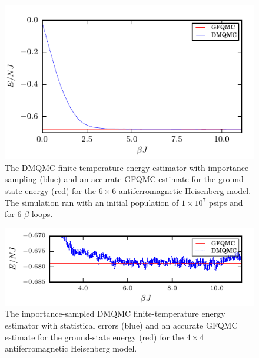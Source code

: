 \begin{figure}[H]
\begin{center}
\includegraphics[width =1\textwidth]{6x6_10000000_6_energy.pdf}
\caption[The DMQMC finite-temperature energy estimator with importance sampling for the $6\times6$ antiferromagnetic Heisenberg model]{The DMQMC finite-temperature energy estimator with importance sampling (blue) and an accurate GFQMC estimate for the ground-state energy (red) for the $6\times6$ antiferromagnetic Heisenberg model. The simulation ran with an initial population of $1\times10^7$ psips and for $6$ $\beta$-loops. }
\label{fig:6x6_10000000_6_energy}
\end{center}
\end{figure} 
\begin{figure}[H]
\begin{center}
\includegraphics[width =1\textwidth]{6x6_10000000_6_energy_subplot.pdf}
\caption[The importance-sampled DMQMC finite-temperature energy estimator with statistical errors for the $4\times4$ antiferromagnetic Heisenberg model.]{The importance-sampled DMQMC finite-temperature energy estimator with statistical errors (blue) and an accurate GFQMC estimate for the ground-state energy (red) for the $4\times4$ antiferromagnetic Heisenberg model. }
\label{fig:6x6_10000000_6_energy_subplot}
\end{center}
\end{figure}

